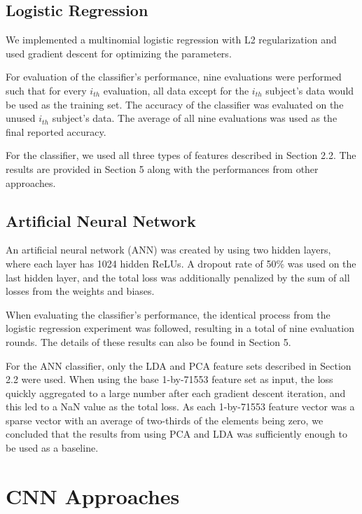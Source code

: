\documentclass{article} %
\begin{document}
\subsection{Logistic Regression}

We implemented a multinomial logistic regression with L2 regularization and used gradient descent for optimizing the parameters. 

For evaluation of the classifier's performance, nine evaluations were performed such that for every $i_{th}$ evaluation, all  data except for the $i_{th}$ subject's data would be used as the training set. The accuracy of the classifier was evaluated on the unused $i_{th}$ subject's data. The average of all nine evaluations was used as the final reported accuracy.

For the classifier, we used all three types of features described in Section 2.2. The results are provided in Section 5 along with the performances from other approaches.

\subsection{Artificial Neural Network}

An artificial neural network (ANN) was created by using two hidden layers, where each layer has 1024 hidden ReLUs. A dropout rate of 50\% was used on the last hidden layer, and the total loss was additionally penalized by the sum of all losses from the weights and biases.

When evaluating the classifier's performance, the identical process from the logistic regression experiment was followed, resulting in a total of nine evaluation rounds. The details of these results can also be found in Section 5. 

For the ANN classifier, only the LDA and PCA feature sets described in Section 2.2 were used. When using the base 1-by-71553 feature set as input, the loss quickly aggregated to a large number after each gradient descent iteration, and this led to a NaN value as the total loss. As each 1-by-71553 feature vector was a sparse vector with an average of two-thirds of the elements being zero, we concluded that the results from using PCA and LDA was sufficiently enough to be used as a baseline.

\section{CNN Approaches}
\end{document}
